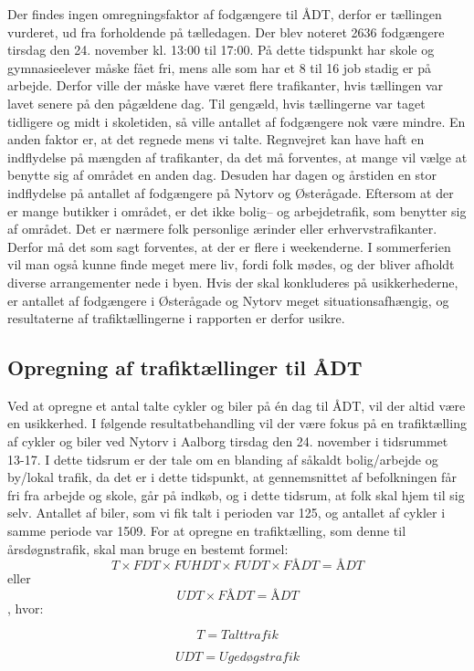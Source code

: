 Der findes ingen omregningsfaktor af fodgængere til ÅDT, derfor er tællingen vurderet, ud fra forholdende på tælledagen. Der blev noteret 2636 fodgængere tirsdag den 24. november kl. 13:00 til 17:00. På dette tidspunkt har skole og gymnasieelever måske fået fri, mens alle som har et 8 til 16 job stadig er på arbejde. Derfor ville der måske have været flere trafikanter, hvis tællingen var lavet senere på den pågældene dag. Til gengæld, hvis tællingerne var taget tidligere og midt i skoletiden, så ville antallet af fodgængere nok være mindre. En anden faktor er, at det regnede mens vi talte. Regnvejret kan have haft en indflydelse på mængden af trafikanter, da det må forventes, at mange vil vælge at benytte sig af området en anden dag. Desuden har dagen og årstiden en stor indflydelse på antallet af fodgængere på Nytorv og Østerågade. Eftersom at der er mange butikker i området, er det ikke bolig– og arbejdetrafik, som benytter sig af området. Det er nærmere folk personlige ærinder eller erhvervstrafikanter. Derfor må det som sagt forventes, at der er flere i weekenderne. I sommerferien vil man også kunne finde meget mere liv, fordi folk mødes, og der bliver afholdt diverse arrangementer nede i byen. Hvis der skal konkluderes på usikkerhederne, er antallet af fodgængere i Østerågade og Nytorv meget situationsafhængig, og resultaterne af trafiktællingerne i rapporten er derfor usikre.
\subsection{Opregning af trafiktællinger til ÅDT}
\label{sub:opregning}
Ved at opregne et antal talte cykler og biler på én dag til ÅDT, vil der altid være en usikkerhed.
I følgende resultatbehandling vil der være fokus på en trafiktælling af cykler og biler ved Nytorv i Aalborg tirsdag den 24. november i tidsrummet 13-17. I dette tidsrum er der tale om en blanding af såkaldt bolig/arbejde og by/lokal trafik, da det er i dette tidspunkt, at gennemsnittet af befolkningen får fri fra arbejde og skole, går på indkøb, og i dette tidsrum, at folk skal hjem til sig selv.
Antallet af biler, som vi fik talt i perioden var 125, og antallet af cykler i samme periode var 1509.
For at opregne en trafiktælling, som denne til årsdøgnstrafik, skal man bruge en bestemt formel:
$$ T \times FDT \times FUHDT \times FUDT \times FÅDT = ÅDT $$ eller $$ UDT \times FÅDT = ÅDT$$ , hvor:

$$T = Talt trafik$$

$$UDT = Ugedøgstrafik$$

